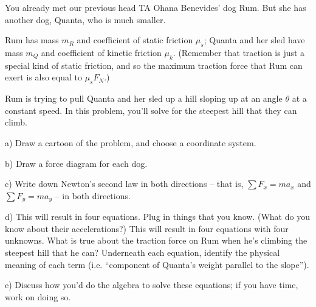\documentclass[12pt]{article}
\begin{document}
You already met our previous head TA Ohana Benevides' dog Rum. But she has another dog, Quanta, who is much smaller.

Rum has mass $m_R$ and coefficient of static friction $\mu_s$; Quanta and her sled have mass $m_Q$ and coefficient of kinetic friction $\mu_k$. (Remember that traction is just a special kind of static friction, and so the maximum traction force that Rum can exert is also equal to $\mu_s F_N$.)

Rum is trying to pull Quanta and her sled up a hill sloping up at an angle $\theta$ at a constant speed. In this problem, you'll solve for the
steepest hill that they can climb.

a) Draw a cartoon of the problem, and choose a coordinate system. 

\vspace{2in}

b) Draw a force diagram for each dog. 

\vspace{3in}
\newpage
c) Write down Newton's second law in both directions -- that is, $\sum F_x = ma_x$ and $\sum F_y = ma_y$ -- 
in both directions.

\vspace{2in}
d) This will result in four equations. Plug in things that you know. (What do you know about their accelerations?) This will result in four equations with 
four unknowns. What is true about the traction force on Rum when he's climbing the steepest hill that he can?
Underneath each equation, identify the physical meaning of each term (i.e. ``component of Quanta's weight parallel to the slope''). 

\vspace{3.5in}

e) Discuss how you'd do the algebra to solve these equations; if you have time, work on doing so.
\end{document}
